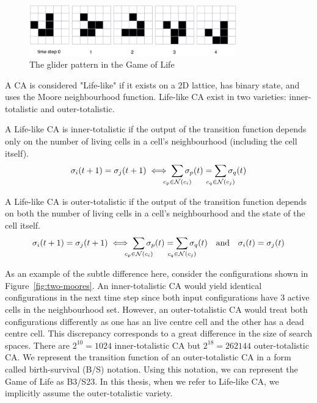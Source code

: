 \begin{figure}[H]
\centering
\includegraphics[width=0.8\textwidth]{images/life-glider.png}
\caption{The glider pattern in the Game of Life \cite{dorin2012framework}}
\label{fig:life-glider}
\end{figure}

A CA is considered "Life-like" if it exists on a 2D lattice, has binary state, and uses the Moore neighbourhood function. Life-like CA exist in two varieties: inner-totalistic and outer-totalistic.

\begin{definition}
A Life-like CA is inner-totalistic if the output of the transition function depends only on the number of living cells in a cell's neighbourhood (including the cell itself).
\begin{equation}
  \sigma_i(t+1) = \sigma_j(t+1) \iff \sum_{\mathclap{c_p \in \mathcal{N}(c_i)}}\sigma_p(t) = \sum_{\mathclap{c_q \in \mathcal{N}(c_j)}}\sigma_q(t)
\end{equation}
\label{def:inner-totalistic}
\end{definition}

\begin{definition}
A Life-like CA is outer-totalistic if the output of the transition function depends on both the number of living cells in a cell's neighbourhood and the state of the cell itself.
\begin{equation}
  \sigma_i(t+1) = \sigma_j(t+1) \iff \sum_{\mathclap{c_p \in \mathcal{N}(c_i)}}\sigma_p(t) = \sum_{\mathclap{c_q \in \mathcal{N}(c_j)}}\sigma_q(t) \quad \textnormal{and} \quad \sigma_i(t) = \sigma_j(t) 
\end{equation}
\label{def:outer-totalistic}
\end{definition}

As an example of the subtle difference here, consider the configurations shown in Figure~\ref{fig:two-moores}. An inner-totalistic CA would yield identical configurations in the next time step since both input configurations have 3 active cells in the neighbourhood set. However, an outer-totalistic CA would treat both configurations differently as one has an live centre cell and the other has a dead centre cell. This discrepancy corresponds to a great difference in the size of search spaces. There are $2^{10}=1024$ inner-totalistic CA but $2^{18} = 262144$ outer-totalistic CA. We represent the transition function of an outer-totalistic CA in a form called birth-survival (B/S) notation. Using this notation, we can represent the Game of Life as B3/S23. In this thesis, when we refer to Life-like CA, we implicitly assume the outer-totalistic variety.\\

